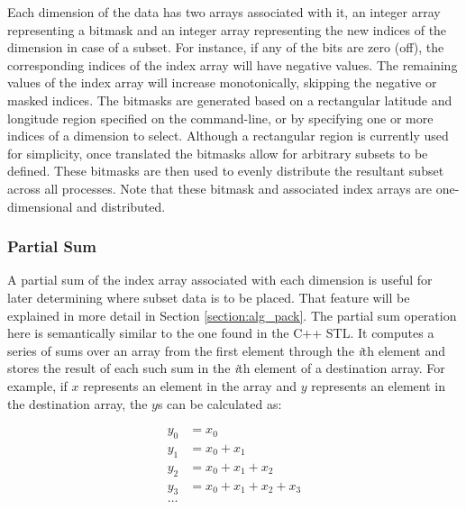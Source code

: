 Each dimension of the data has two arrays associated with it, an integer array
representing a bitmask and an integer array representing the new indices of
the dimension in case of a subset.  For instance, if any of the bits are
zero (off), the corresponding indices of the index array will have negative
values.  The remaining values of the index array will increase monotonically,
skipping the negative or masked indices.  The bitmasks are generated based on
a rectangular latitude and longitude region specified on the command-line, or
by specifying one or more indices of a dimension to select.  Although a
rectangular region is currently used for simplicity, once translated the
bitmasks allow for arbitrary subsets to be defined.  These bitmasks are then
used to evenly distribute the resultant subset across all processes.  Note
that these bitmask and associated index arrays are one-dimensional and
distributed.

\subsubsection{Partial Sum}


A partial sum of the index array associated with each dimension is useful for
later determining where subset data is to be placed.  That feature will be
explained in more detail in Section \ref{section:alg_pack}.  The partial sum
operation here is semantically similar to the one found in the C++
STL\cite{CXXSTL}.  It computes a series of sums over an array from the first
element through the \emph{i}th element and stores the result of each such sum
in the \emph{i}th element of a destination array.  For example, if $x$
represents an element in the array and $y$ represents an element in the
destination array, the $y$s can be calculated as:

\begin{equation}
\begin{split}
y_0 &= x_0\\
y_1 &= x_0 + x_1\\
y_2 &= x_0 + x_1 + x_2\\
y_3 &= x_0 + x_1 + x_2 + x_3\\
\ldots
\end{split}
\end{equation}


